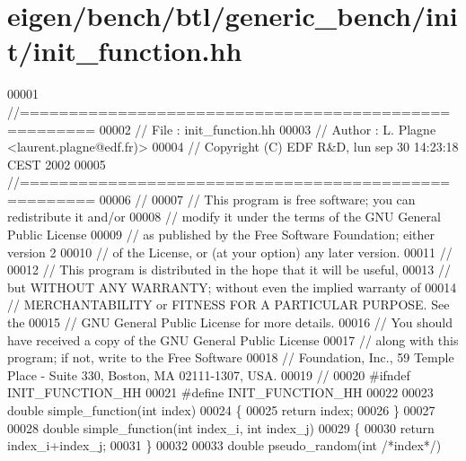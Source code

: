 \hypertarget{eigen_2bench_2btl_2generic__bench_2init_2init__function_8hh_source}{}\section{eigen/bench/btl/generic\+\_\+bench/init/init\+\_\+function.hh}
\label{eigen_2bench_2btl_2generic__bench_2init_2init__function_8hh_source}

\begin{DoxyCode}
00001 \textcolor{comment}{//=====================================================}
00002 \textcolor{comment}{// File   :  init\_function.hh}
00003 \textcolor{comment}{// Author :  L. Plagne <laurent.plagne@edf.fr)>        }
00004 \textcolor{comment}{// Copyright (C) EDF R&D,  lun sep 30 14:23:18 CEST 2002}
00005 \textcolor{comment}{//=====================================================}
00006 \textcolor{comment}{// }
00007 \textcolor{comment}{// This program is free software; you can redistribute it and/or}
00008 \textcolor{comment}{// modify it under the terms of the GNU General Public License}
00009 \textcolor{comment}{// as published by the Free Software Foundation; either version 2}
00010 \textcolor{comment}{// of the License, or (at your option) any later version.}
00011 \textcolor{comment}{// }
00012 \textcolor{comment}{// This program is distributed in the hope that it will be useful,}
00013 \textcolor{comment}{// but WITHOUT ANY WARRANTY; without even the implied warranty of}
00014 \textcolor{comment}{// MERCHANTABILITY or FITNESS FOR A PARTICULAR PURPOSE.  See the}
00015 \textcolor{comment}{// GNU General Public License for more details.}
00016 \textcolor{comment}{// You should have received a copy of the GNU General Public License}
00017 \textcolor{comment}{// along with this program; if not, write to the Free Software}
00018 \textcolor{comment}{// Foundation, Inc., 59 Temple Place - Suite 330, Boston, MA  02111-1307, USA.}
00019 \textcolor{comment}{// }
00020 \textcolor{preprocessor}{#ifndef INIT\_FUNCTION\_HH}
00021 \textcolor{preprocessor}{#define INIT\_FUNCTION\_HH}
00022 
00023 \textcolor{keywordtype}{double} simple\_function(\textcolor{keywordtype}{int} index)
00024 \{
00025   \textcolor{keywordflow}{return} index;
00026 \}
00027 
00028 \textcolor{keywordtype}{double} simple\_function(\textcolor{keywordtype}{int} index\_i, \textcolor{keywordtype}{int} index\_j)
00029 \{
00030   \textcolor{keywordflow}{return} index\_i+index\_j;
00031 \}
00032 
00033 \textcolor{keywordtype}{double} pseudo\_random(\textcolor{keywordtype}{int} \textcolor{comment}{/*index*/})

\end{DoxyCode}
